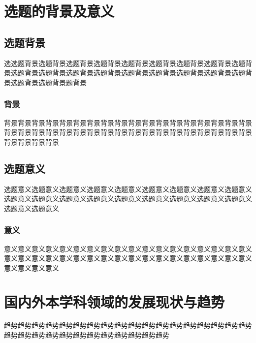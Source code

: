 
\makecontenttop

\section{选题的背景及意义}

\subsection{选题背景}

选选题背景选题背景选题背景选题背景选题背景选题背景选题背景选题背景选题背景选题背景选题背景选题背景选题背景选题背景选题背景选题背景选题背景选题背景选题背景选题背景题背景

\subsubsection{背景}

背景背景背景背景背景背景背景背景背景背景背景背景背景背景背景背景背景背景背景背景背景背景背景背景背景背景背景背景背景背景背景背景背景背景背景背景背景背景背景背景

\subsection{选题意义}

选题意义选题意义选题意义选题意义选题意义选题意义选题意义选题意义选题意义选题意义选题意义选题意义选题意义选题意义选题意义选题意义选题意义选题意义选题意义选题意义

\subsubsection{意义}

意义意义意义意义意义意义意义意义意义意义意义意义意义意义意义意义意义意义意义意义意义意义意义意义意义意义意义意义意义意义意义意义意义意义意义意义意义意义意义意义

\section{国内外本学科领域的发展现状与趋势}

趋势趋势趋势趋势趋势趋势趋势趋势趋势趋势趋势趋势趋势趋势趋势趋势趋势趋势趋势趋势趋势趋势趋势趋势趋势趋势趋势趋势趋势趋势

